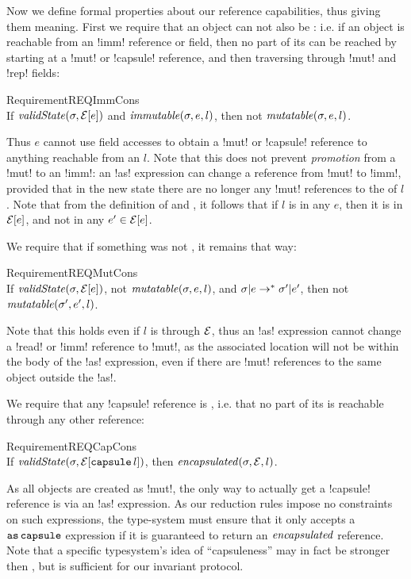 Now we define formal properties about our reference capabilities, thus giving them meaning. First we require that
an \immut object can not also be \muty: i.e. if an object is reachable from an \Q!imm! reference or field, then no part of its \rog can be reached by starting at a \Q!mut! or \Q!capsule! reference, and then traversing through \Q!mut! and \Q!rep! fields:
\SS\begin{restatable}{Requirement}{REQImmCons}\ \\
	\indent If $\mathit{validState}(\sigma, \mathcal{E}[e])$ and $\mathit{immutable}(\sigma, e, l)$, then not $\mathit{mutatable}(\sigma, e, l)$.
\end{restatable}
\SS\noindent Thus $e$ cannot use field accesses to obtain a \Q!mut! or \Q!capsule! reference to anything reachable from an \immut $l$.
Note that this does not prevent \emph{promotion} from a \Q!mut! to an \Q!imm!: an \Q!as! expression can change a reference from \Q!mut! to \Q!imm!, provided that in the new state there are no longer any \Q!mut! references to the \rog of $l$. Note that from the definition of \muty and \immut, it follows that if $l$ is \immut in any $e$,
then it is \immut in $\mathcal{E}[e]$, and not \muty in any $e' \in \mathcal{E}[e]$.

\LS 

\noindent We require that if something was not \muty, it remains that way:%
\SS\begin{restatable}{Requirement}{REQMutCons}\ \\
	\indent If $\mathit{validState}(\sigma, \mathcal{E}[e])$, not $\mathit{mutatable}(\sigma, e, l)$, and $\sigma|e \rightarrow^{*} \sigma'|e'$, then not $\mathit{mutatable}(\sigma', e', l)$.
\end{restatable}
\SS\noindent Note that this holds even if $l$ is \muty through $\mathcal{E}$, thus an \Q!as! expression cannot change a \Q!read! or \Q!imm! reference to \Q!mut!, as the associated location will not be \muty within the body of the \Q!as! expression, even if there are \Q!mut! references to the same object outside the \Q!as!.

\LS

We require that any \Q!capsule! reference is \encap, i.e. that no \muty part of its \rog is reachable through any other reference:%
\SS\begin{restatable}{Requirement}{REQCapCons}\ \\
\indent If $\mathit{validState}(\sigma,\mathcal{E}[\texttt{capsule}\,l])$, then $\mathit{encapsulated}(\sigma, \mathcal{E}, l)$.
\end{restatable}%
\SS\noindent As all objects are created as \Q!mut!, the only way to actually get a \Q!capsule! reference is via an \Q!as! expression.
As our reduction rules impose no constraints on such expressions, the type-system must ensure that it only accepts a $\texttt{as}\,\texttt{capsule}$ expression if it is guaranteed to 
return an $\mathit{encapsulated}$ reference. Note that a specific typesystem's idea of ``capsuleness'' may in fact be stronger then \encap, but \encap is sufficient for our invariant protocol.

